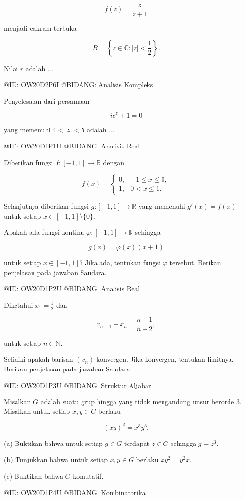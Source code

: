 $$
f(z)=\frac{z}{z+1}
$$

menjadi cakram terbuka

$$
B=\left\{z\in\mathbb C:|z|<\frac12\right\}.
$$

Nilai $r$ adalah $\ldots$

@ID: OW20D2P6I
@BIDANG: Analisis Kompleks

Penyelesaian dari persamaan

$$
ie^z+1=0
$$

yang memenuhi $4<|z|<5$ adalah $\ldots$

@ID: OW20D1P1U
@BIDANG: Analisis Real

Diberikan fungsi $f:[-1,1]\to\mathbb R$ dengan

$$
f(x)=
\begin{cases}
0,&-1\le x\le0,\\
1,&0<x\le1.
\end{cases}
$$

Selanjutnya diberikan fungsi $g:[-1,1]\to\mathbb R$ yang memenuhi $g'(x)=f(x)$ untuk setiap $x\in[-1,1]\setminus\{0\}$.

Apakah ada fungsi kontinu $\varphi:[-1,1]\to\mathbb R$ sehingga

$$
g(x)=\varphi(x)(x+1)
$$

untuk setiap $x\in[-1,1]$? Jika ada, tentukan fungsi $\varphi$ tersebut. Berikan penjelasan pada jawaban Saudara.

@ID: OW20D1P2U
@BIDANG: Analisis Real

Diketahui $x_1=\frac12$ dan

$$
x_{n+1}-x_n=\frac{n+1}{n+2},
$$

untuk setiap $n\in\mathbb N$.

Selidiki apakah barisan $(x_n)$ konvergen. Jika konvergen, tentukan limitnya. Berikan penjelasan pada jawaban Saudara.

@ID: OW20D1P3U
@BIDANG: Struktur Aljabar

Misalkan $G$ adalah suatu grup hingga yang tidak mengandung unsur berorde $3$. Misalkan untuk setiap $x,y\in G$ berlaku

$$
(xy)^3=x^3y^3.
$$

(a) Buktikan bahwa untuk setiap $g\in G$ terdapat $z\in G$ sehingga $g=z^3$.

(b) Tunjukkan bahwa untuk setiap $x,y\in G$ berlaku $xy^2=y^2x$.

(c) Buktikan bahwa $G$ komutatif.

@ID: OW20D1P4U
@BIDANG: Kombinatorika

